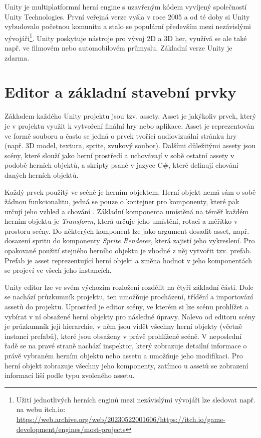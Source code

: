 \documentclass[FM,Proj,bw]{tulthesis}
\begin{document}
	Unity je multiplatformní herní engine s uzavřeným kódem vyvíjený společností Unity Technologies. První veřejná verze vyšla v roce 2005 a od té doby si Unity vybudovalo početnou komunitu a stalo se populární především mezi nezávislými vývojáři\footnote{Užití jednotlivých herních enginů mezi nezávislými vývojáři lze sledovat např. na webu itch.io: \url{https://web.archive.org/web/20230522001606/https://itch.io/game-development/engines/most-projects}}. Unity poskytuje nástroje pro vývoj 2D a 3D her, využívá se ale také např. ve filmovém nebo automobilovém průmyslu. Základní verze Unity je zdarma.
	
	\section{Editor a základní stavební prvky}
	
	Základem každého Unity projektu jsou tzv. assety. Asset je jakýkoliv prvek, který je v projektu využit k vytvoření finální hry nebo aplikace. Asset je reprezentován ve formě souboru a často se jedná o prvek tvořící audiovizuální stránku hry (např. 3D model, textura, sprite, zvukový soubor). Dalšími důležitými assety jsou scény, které slouží jako herní prostředí a uchovávají v sobě ostatní assety v podobě herních objektů, a skripty psané v jazyce C\#, které definují chování daných herních objektů.  \cite{UnityDocsAssetWorkflow}
	
	Každý prvek použitý ve scéně je herním objektem. Herní objekt nemá sám o sobě žádnou funkcionalitu, jedná se pouze o kontejner pro komponenty, které pak určují jeho vzhled a chování \cite{UnityDocsGameObject}. Základní komponenta umístěná na téměř každém herním objektu je \textit{Transform}, která určuje jeho umístění, rotaci a měřítko v prostoru scény. Do některých komponent lze jako argument dosadit asset, např. dosazení spritu do komponenty \textit{Sprite Renderer}, která zajistí jeho vykreslení. Pro opakované použití stejného herního objektu je vhodné z něj vytvořit tzv. prefab. Prefab je asset reprezentující herní objekt a změna hodnot v jeho komponentách se projeví ve všech jeho instancích.
	
	Unity editor lze ve svém výchozím rozložení rozdělit na čtyři základní části. Dole se nachází průzkumník projektu, ten umožňuje procházení, třídění a importování assetů do projektu. Uprostřed je editor scény, ve kterém si lze scénu prohlížet a vybírat v ní obsažené herní objekty pro následné úpravy. Nalevo od editoru scény je průzkumník její hierarchie, v něm jsou vidět všechny herní objekty (včetně instancí prefabů), které jsou obsaženy v právě prohlížené scéně. V neposlední řadě se na pravé straně nachází inspektor, který zobrazuje detailní informace o právě vybraném herním objektu nebo assetu a umožňuje jeho modifikaci. Pro herní objekt zobrazuje všechny jeho komponenty, zatímco u assetů se zobrazení informací liší podle typu zvoleného assetu.
	
\end{document}

